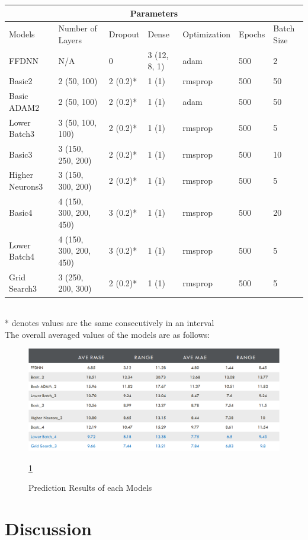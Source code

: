 \documentclass[10pt,11pt,12pt,oneside]{book}
\begin{document}
\begin{tabular}{ |p{2cm}||p{2.5cm}|p{1.5cm}|p{1.5cm}| p{2.5cm} | p{1.5cm}| p{1.5cm} |   }
 \hline
 \multicolumn{7}{|c|}{Parameters} \\
 \hline
Models & Number of Layers & Dropout & Dense & Optimization & Epochs & Batch Size\\
 \hline
 FFDNN & N/A & 0 & 3 (12, 8, 1) & adam & 500 & 2\\
 \hline
 Basic2 & 2 (50, 100) & 2 (0.2)* & 1 (1) & rmsprop & 500 & 50\\
 \hline
 Basic ADAM2 & 2 (50, 100) & 2 (0.2)* & 1 (1) & adam & 500 & 50\\
 \hline
 Lower Batch3 & 3 (50, 100, 100) & 2 (0.2)* & 1 (1) & rmsprop & 500 & 5\\
 \hline
 Basic3 & 3 (150, 250, 200) & 2 (0.2)* & 1 (1) & rmsprop & 500 & 10\\
 \hline
Higher Neurons3 & 3 (150, 300, 200) & 2 (0.2)* & 1 (1) & rmsprop & 500 & 5\\
 \hline
 Basic4 & 4 (150, 300, 200, 450) & 3 (0.2)* & 1 (1) & rmsprop & 500 & 20\\
 \hline
 Lower Batch4 & 4 (150, 300, 200, 450) & 3 (0.2)* & 1 (1) & rmsprop & 500 & 5\\
 \hline
 Grid Search3 & 3 (250, 200, 300) & 2 (0.2)* & 1 (1) & rmsprop & 500 & 5\\
 \hline
 
 
 \hline
\end{tabular}
    \\ * denotes values are the same consecutively in an interval\\
    The overall averaged values of the models are as follows:
    \begin{figure}
         \includegraphics[width=\linewidth]{results.png}
         \caption{Prediction Results of each Models}
         \label{fig:results}
         \ref{fig:results}
\end{figure}

\section{Discussion}
\end{document}
